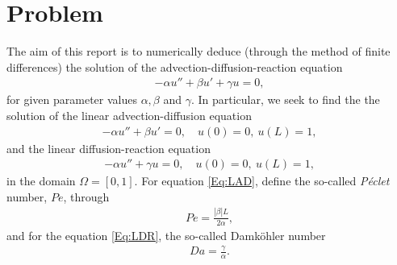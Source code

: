 \documentclass[a4paper,11pt]{article}
\theoremstyle{break}
\theoremstyle{break2}
\theoremstyle{break}
\theoremstyle{break2}
\begin{document}
\section{Problem}
The aim of this report is to numerically deduce (through the method of finite differences) the solution of the advection-diffusion-reaction equation
\begin{align*}
-\alpha u'' + \beta u' + \gamma u = 0,
\end{align*}
for given parameter values $ \alpha,\beta $ and $ \gamma $. In particular, we seek to find the the solution of the linear advection-diffusion equation
\begin{align}\label{Eq:LAD}
-\alpha u'' + \beta u' = 0, \quad u(0) = 0,\ u(L) = 1,
\end{align}
and the linear diffusion-reaction equation
\begin{align}\label{Eq:LDR}
-\alpha u'' + \gamma u = 0, \quad u(0) = 0,\ u(L) = 1,
\end{align}
in the domain $ \Omega = [0,1] $. For equation \eqref{Eq:LAD}, define the so-called \emph{P\'{e}clet} number, $ Pe $, through
\begin{align*}
Pe = \frac{|\beta|L}{2\alpha},
\end{align*}
and for the equation \eqref{Eq:LDR}, the so-called Damk\"{o}hler number
\begin{align*}
Da = \frac{\gamma}{\alpha}.
\end{align*}
\end{document}
